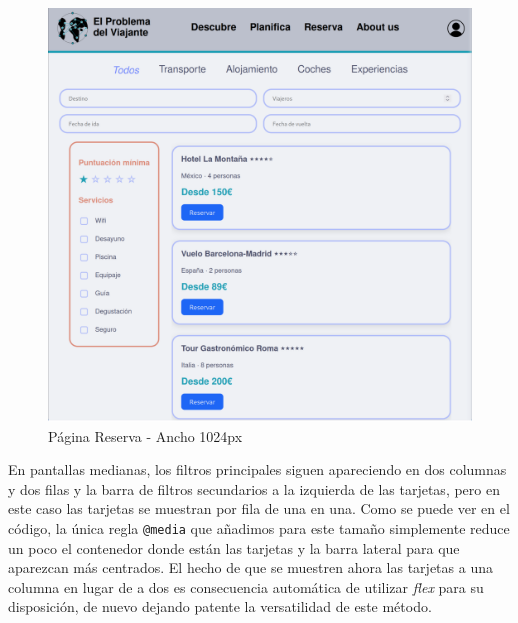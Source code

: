 \documentclass[11pt, a4paper]{book}
\begin{document}
    \begin{figure} [H]
		\centering
		\includegraphics[height=0.4\textheight]{CSS/5-3 1024.png}
		\caption{Página Reserva - Ancho 1024px}
	\end{figure}

    En pantallas medianas, los filtros principales siguen apareciendo en dos columnas y dos filas y la barra de filtros secundarios a la izquierda de las tarjetas, pero en este caso las tarjetas se muestran por fila de una en una. Como se puede ver en el código, la única regla \texttt{@media} que añadimos para este tamaño simplemente reduce un poco el contenedor donde están las tarjetas y la barra lateral para que aparezcan más centrados. El hecho de que se muestren ahora las tarjetas a una columna en lugar de a dos es consecuencia automática de utilizar \textit{flex} para su disposición, de nuevo dejando patente la versatilidad de este método.
	
\end{document}
